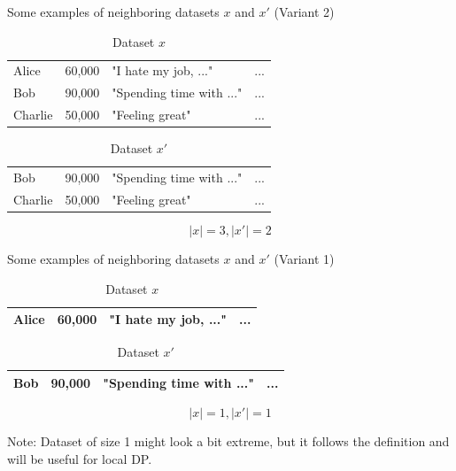 \documentclass[12pt,aspectratio=169,handout]{beamer}
\begin{document}
\begin{frame}{Some examples of neighboring datasets $x$ and $x'$ (Variant 2)}
	
\begin{table}
	\begin{tabular}{lrll}
		\toprule
		Alice & 60,000 & "I hate my job, ..." & ... \\
		Bob & 90,000 & "Spending time with ..." & ...\\
		Charlie & 50,000 & "Feeling great" & ...\\
		\bottomrule
	\end{tabular}
	\caption{Dataset $x$}
\end{table}
\begin{table}
	\begin{tabular}{lrll}
		\toprule
		Bob & 90,000 & "Spending time with ..." & ...\\
		Charlie & 50,000 & "Feeling great" & ...\\
		\bottomrule
	\end{tabular}
	\caption{Dataset $x'$}
\end{table}	
$$|x| = 3, |x'| = 2$$
\end{frame}


\begin{frame}{Some examples of neighboring datasets $x$ and $x'$ (Variant 1)}
	
\begin{table}
	\begin{tabular}{lrll}
		\toprule
		Alice & 60,000 & "I hate my job, ..." & ... \\
		\bottomrule
	\end{tabular}
	\caption{Dataset $x$}
\end{table}
\begin{table}
	\begin{tabular}{lrll}
		\toprule
		Bob & 90,000 & "Spending time with ..." & ...\\
		\bottomrule
	\end{tabular}
	\caption{Dataset $x'$}
\end{table}	
$$|x| = 1, |x'| = 1$$

Note: Dataset of size 1 might look a bit extreme, but it follows the definition and will be useful for local DP.

\end{frame}
\end{document}
